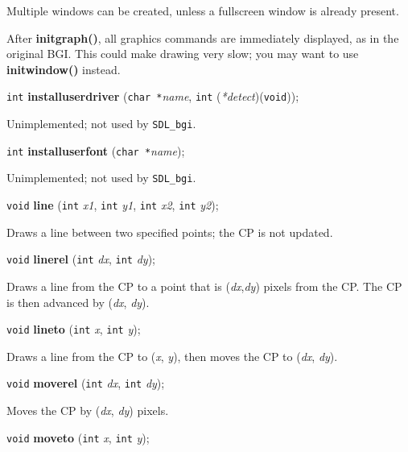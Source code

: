 \documentclass[a4paper,11pt]{article}
\newcommand{\SDLbgi}{\texttt{SDL\_bgi}}
\newcommand{\V}{\texttt{void}}      %
\newcommand{\I}{\texttt{int}}       %
\newcommand{\C}{\texttt{char *}}    %
\newcommand{\func}[1]{\textbf{#1}}  %
\newcommand{\A}[1]{\emph{#1}}       %
\newenvironment{bgi}
{ %
  \begin{snugshade}
}
{ %
  \end{snugshade}
}
\begin{document}
Multiple windows can be created, unless a fullscreen window is already
present.

After \func{initgraph()}, all graphics commands are immediately
displayed, as in the original BGI. This could make drawing very slow;
you may want to use \func{initwindow()} instead.


\begin{bgi}
\I{} \func{installuserdriver} (\C{}\A{name}, \I{} (\A{*detect})(\V{})); 
\end{bgi}

Unimplemented; not used by \SDLbgi.


\begin{bgi}
\I{} \func{installuserfont} (\C{}\A{name}); 
\end{bgi}

Unimplemented; not used by \SDLbgi.


\begin{bgi}
\V{} \func{line} (\I{} \A{x1}, \I{} \A{y1}, \I{} \A{x2}, \I{} \A{y2});
\end{bgi}

Draws a line between two specified points; the CP is not updated.


\begin{bgi}
\V{} \func{linerel} (\I{} \A{dx}, \I{} \A{dy});
\end{bgi}

Draws a line from the CP to a point that is (\A{dx},\A{dy}) pixels
from the CP. The CP is then advanced by (\A{dx}, \A{dy}).


\begin{bgi}
\V{} \func{lineto} (\I{} \A{x}, \I{} \A{y});
\end{bgi}

Draws a line from the CP to (\A{x}, \A{y}), then moves the CP to
(\A{dx}, \A{dy}).


\begin{bgi}
\V{} \func{moverel} (\I{} \A{dx}, \I{} \A{dy});
\end{bgi}

Moves the CP by (\A{dx}, \A{dy}) pixels.


\begin{bgi}
\V{} \func{moveto} (\I{} \A{x}, \I{} \A{y});
\end{bgi}
\end{document}
